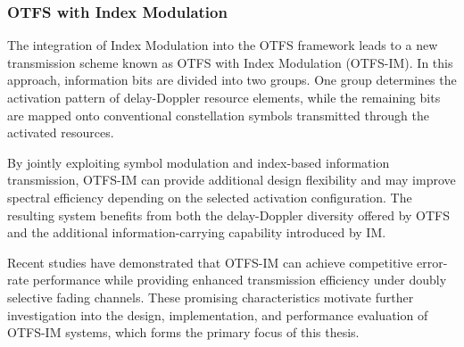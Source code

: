 \subsubsection{OTFS with Index Modulation}

The integration of Index Modulation into the OTFS framework leads to a new transmission scheme known as OTFS with Index Modulation (OTFS-IM). In this approach, information bits are divided into two groups. One group determines the activation pattern of delay-Doppler resource elements, while the remaining bits are mapped onto conventional constellation symbols transmitted through the activated resources.

By jointly exploiting symbol modulation and index-based information transmission, OTFS-IM can provide additional design flexibility and may improve spectral efficiency depending on the selected activation configuration. The resulting system benefits from both the delay-Doppler diversity offered by OTFS and the additional information-carrying capability introduced by IM.

Recent studies have demonstrated that OTFS-IM can achieve competitive error-rate performance while providing enhanced transmission efficiency under doubly selective fading channels. These promising characteristics motivate further investigation into the design, implementation, and performance evaluation of OTFS-IM systems, which forms the primary focus of this thesis.

